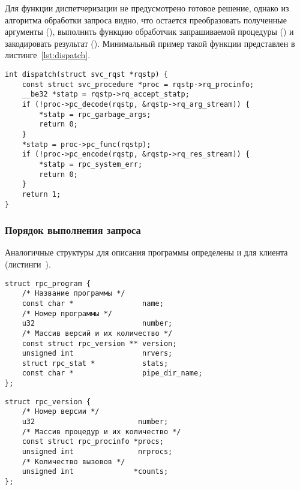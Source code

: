 Для функции диспетчеризации не предусмотрено готовое решение, однако из
алгоритма обработки запроса видно, что остается преобразовать полученные
аргументы (), выполнить функцию обработчик запрашиваемой
процедуры () и закодировать результат ().
Минимальный пример такой функции представлен в листинге~\ref{lst:dispatch}.

\begin{lstlisting}[caption={Минимальная реализация функции диспетчеризации}, label={lst:dispatch}]
int dispatch(struct svc_rqst *rqstp) {
    const struct svc_procedure *proc = rqstp->rq_procinfo;
    __be32 *statp = rqstp->rq_accept_statp;
    if (!proc->pc_decode(rqstp, &rqstp->rq_arg_stream)) {
        *statp = rpc_garbage_args;
        return 0;
    }
    *statp = proc->pc_func(rqstp);
    if (!proc->pc_encode(rqstp, &rqstp->rq_res_stream)) {
        *statp = rpc_system_err;
        return 0;
    }
    return 1;
}
\end{lstlisting}

\subsubsection{Порядок выполнения запроса}

Аналогичные структуры для описания программы определены и для клиента
(листинги~).

\clearpage

\begin{lstlisting}[caption={Структура программы}, label={lst:struct_rpc_program}]
struct rpc_program {
    /* Название программы */
    const char *                name;
    /* Номер программы */
    u32                         number;
    /* Массив версий и их количество */
    const struct rpc_version ** version;
    unsigned int                nrvers;
    struct rpc_stat *           stats;
    const char *                pipe_dir_name;
};
\end{lstlisting}

\begin{lstlisting}[caption={Структура версии}, label={lst:struct_rpc_version}]
struct rpc_version {
    /* Номер версии */
    u32                        number;
    /* Массив процедур и их количество */
    const struct rpc_procinfo *procs;
    unsigned int               nrprocs;
    /* Количество вызовов */
    unsigned int              *counts;
};
\end{lstlisting}

